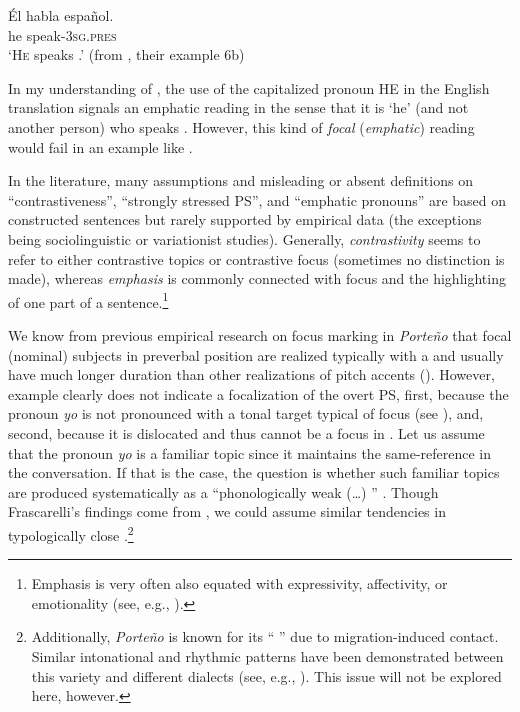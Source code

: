 \documentclass[output=paper]{langsci/langscibook}
\begin{document}
\ea\label{ex:pes:3}
\gll Él    habla      espa{\~n}ol.\\
       he    speak-\textsc{3sg}.\textsc{pres} \\
\glt ‘\textsc{He} speaks .’    (from \citealt[7]{Biberauer2010}, their example 6b)
\z

In my understanding of , the use of the capitalized pronoun HE in the English translation signals an emphatic reading in the sense that it is ‘he’ (and not another person) who speaks . However, this kind of \textit{focal} (\textit{emphatic}) reading would fail in an example like . 

In the literature, many assumptions and misleading or absent definitions on ``contrastiveness'', ``strongly stressed PS'', and ``emphatic pronouns'' are based on constructed sentences but rarely supported by empirical data (the exceptions being sociolinguistic or variationist studies). Generally, \textit{contrastivity} seems to refer to either contrastive topics or contrastive focus (sometimes no distinction is made), whereas \textit{emphasis} is commonly connected with focus and the  highlighting of one part of a sentence.\footnote{Emphasis is very often also equated with expressivity, affectivity, or emotionality (see, e.g., \citealt{Pustka2015}).}

We know from previous empirical research on focus marking in \textit{Porte{\~n}o}  that focal (nominal) subjects in preverbal position are realized typically with a  and usually have much longer duration than other realizations of pitch accents (\citealt[383]{Peskova2012}). However, example  clearly does not indicate a focalization of the overt PS, first, because the pronoun \textit{yo} is not pronounced with a tonal target typical of focus (see ), and, second, because it is dislocated and thus cannot be a focus in . Let us assume that the pronoun \textit{yo} is a familiar topic since it maintains the same-reference in the conversation. If that is the case, the question is whether such familiar topics are produced systematically as a ``phonologically weak (…) '' \citep[712]{Frascarelli2007}. Though Frascarelli’s findings come from , we could assume similar tendencies in typologically close .\footnote{Additionally, \textit{Porte{\~n}o}  is known for its `` '' due to migration-induced contact. Similar intonational and rhythmic patterns have been demonstrated between this  variety and different  dialects (see, e.g., \citealt{VidaldeBattini1964,Colantoni2004,Benet2012}). This issue will not be explored here, however.}
\end{document}
